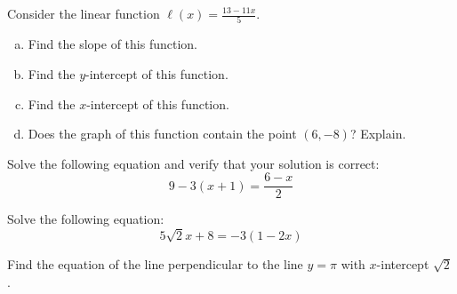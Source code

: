 \documentclass[11pt,letterpaper]{article}
\begin{document}

 Consider the linear function $\ell(x)= \frac{13 - 11x}{5}$. 
	\begin{enumerate}[(a)]
	\item Find the slope of this function.
	\item Find the $y$-intercept of this function.
	\item Find the $x$-intercept of this function.
	\item Does the graph of this function contain the point $(6, -8)$? Explain. 
	\end{enumerate}



\newpage



 Solve the following equation and verify that your solution is correct:
	\[
	9 - 3(x + 1)= \dfrac{6 - x}{2}
	\]



\newpage



 Solve the following equation:
	\[
	5\sqrt{2} x + 8= -3(1 - 2x)
	\] 



\newpage



 Find the equation of the line perpendicular to the line $y= \pi$ with $x$-intercept $\sqrt{2}$. 
\end{document}
